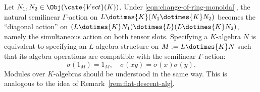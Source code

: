 \begin{remark}\label{rem:Galois-descent-alg}
	Let $N_1,N_2\in\Obj(\cate{Vect}(K))$. Under
	\eqref{eqn:change-of-ring-monoidal}, the natural semilinear $\Gamma$-action
	on $L\dotimes{K}(N_1\dotimes{K}N_2)$ becomes the ``diagonal action'' on
	$(L\dotimes{K}N_1)\dotimes{L}(L\dotimes{K}N_2)$, namely the simultaneous
	action on both tensor slots. Specifying a $K$-algebra $N$ is equivalent to
	specifying an $L$-algebra structure on $M:=L\dotimes{K}N$ such that its
	algebra operations are compatible with the semilinear $\Gamma$-action:
	\[ \sigma(1_M) = 1_M , \quad \sigma (xy) = \sigma(x) \sigma(y). \]
	Modules over $K$-algebras should be understood in the same way. This is
	analogous to the idea of Remark~\ref{rem:flat-descent-alg}.
\end{remark}
